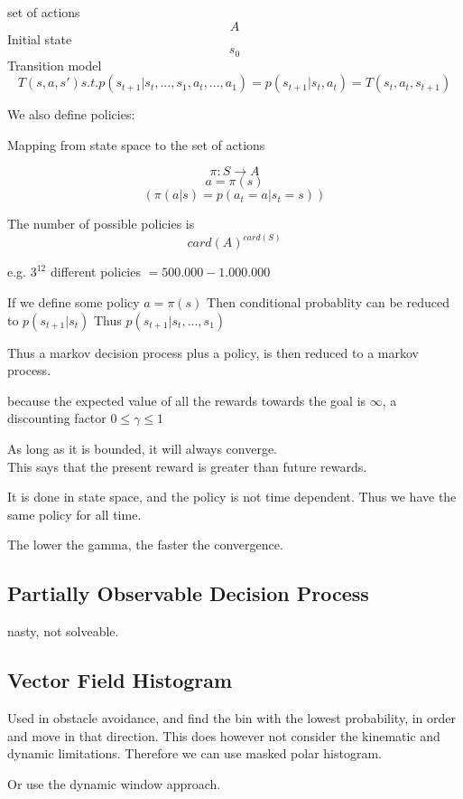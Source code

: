 \documentclass[a4paper]{article}
\begin{document}
 set of actions
 \begin{equation}
 A
 \end{equation}
 Initial state
 \begin{equation}
 s_0
 \end{equation}
 Transition model
 \begin{equation}
	 T(s,a,s') s.t. p(s_{t+1}|s_t,...,s_1, a_t,...,a_1) = p(s_{t+1}|s_t,a_t) = T(s_t, a_t, s_{t+1})
 \end{equation}
 
 We also define policies:

 Mapping from state space to the set of actions

 \begin{equation}
 \pi : S \rightarrow A
 \end{equation}
 \begin{equation}
 a = \pi(s)
 \end{equation}
 \begin{equation}
	 (\pi(a|s) = p(a_t=a|s_t=s))
 \end{equation}
 
The number of possible policies is
\begin{equation}
card(A)^{card(S)} 
\end{equation}

e.g. $ 3^{12} $ different policies $ =500.000 - 1.000.000 $

If we define some policy $ a = \pi(s) $
Then conditional probablity can be reduced to $ p(s_{t+1}|s_t) $
Thus  $ p(s_{t+1}|s_t,...,s_1) $

Thus a markov decision process plus a policy, is then reduced to a markov process. 


because the expected value of all the rewards towards the goal is $ \infty  $, a discounting factor $ 0 \leq \gamma \leq 1 $

As long as it is bounded, it will always converge. \\
This says that the present reward is greater than future rewards. 

It is done in state space, and the policy is not time dependent. Thus we have the same policy for all time. 

The lower the gamma, the faster the convergence. 

\subsection{Partially Observable Decision Process}
nasty, not solveable.

\subsection{Vector Field Histogram}
Used in obstacle avoidance, and find the bin with the lowest probability, in order and move in that direction. This does however not consider the kinematic and dynamic limitations. Therefore we can use masked polar histogram. 

Or use the dynamic window approach.
\end{document}
